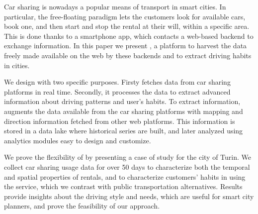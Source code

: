 Car sharing is nowadays a popular means of transport in smart cities. In particular, the free-floating paradigm lets the customers look for available cars, book one, and then start and stop the rental at their will, within a specific area. This is done thanks to a smartphone app, which contacts a web-based backend to exchange information. In this paper we present \tool, a platform to harvest the data freely made available on the web by these backends and to extract driving habits in cities.

We design \tool with two specific purposes. Firsty \tool fetches data from car sharing platforms in real time. Secondly, it processes the data to extract advanced information about driving patterns and user's habits. To extract information, \tool augments the data available from the car sharing platforms with mapping and direction information fetched from other web platforms. This information is stored in a data lake where historical series are built, and later analyzed using analytics modules easy to design and customize. 

We prove the flexibility of \tool by presenting a case of study for the city of Turin. We collect car sharing usage data for over 50 days to  characterize both the temporal and spatial properties of rentals, and to characterize customers' habits in using the service, which we contrast with public transportation  alternatives. Results provide insights about the driving style and needs, which are useful for smart city planners, and prove the feasibility of our approach.
